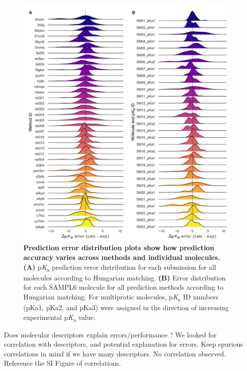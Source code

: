 \documentclass[9pt,lineno,final]{elife}
\newcommand{\pKa}{p\textit{K}\textsubscript{a}}
\begin{document}
\begin{figure}
\centering
\includegraphics[width=1.0\linewidth]{figures/typeIII-error-distribution.pdf}
\caption{{\bf Prediction error distribution plots show how prediction accuracy varies across methods and individual molecules.}
{\bf(A)} \pKa{} prediction error distribution for each submission for all molecules according to Hungarian matching. {\bf(B)} Error distribution for each SAMPL6 molecule for all prediction methods according to Hungarian matching. For multiprotic molecules, \pKa{} ID numbers (pKa1, pKa2, and pKa3) were assigned in the direction of increasing experimental \pKa{} value. 
}
\label{fig:typeIII-error-distribution}
\end{figure}





Does molecular descriptors explain errors/performance ?
We looked for correlation with descriptors, and potential explanation for errors. Keep spurious correlations in mind if we have many descriptors. No correlation observed. Reference the SI Figure of correlations.

\end{document}
